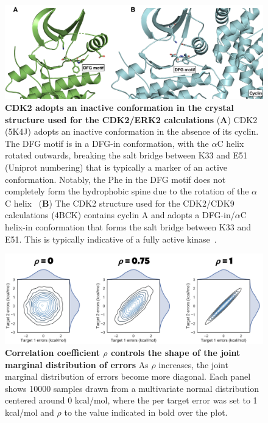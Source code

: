 \documentclass[phd,tocprelim]{cornell}
\begin{document}
\begin{landscape}
\begin{figure}[p]
\centering
\includegraphics[width=1.0\linewidth]{figures/supp_figure1.png}
\caption[CDK2 adopts an inactive conformation in the crystal structure used for the CDK2/ERK2 calculations]{
{\bf CDK2 adopts an inactive conformation in the crystal structure used for the CDK2/ERK2 calculations} 
({\bf A}) CDK2 (5K4J) adopts an inactive conformation in the absence of its cyclin. The DFG motif is in a DFG-in conformation, with the $\alpha$C helix rotated outwards, breaking the salt bridge between K33 and E51 (Uniprot numbering) that is typically a marker of an active conformation. Notably, the Phe in the DFG motif does not completely form the hydrophobic spine due to the rotation of the $\alpha$C helix~\citep{Hu:2015kh}
({\bf B}) The CDK2 structure used for the CDK2/CDK9 calculations (4BCK) contains cyclin A and adopts a DFG-in/$\alpha$C helix-in conformation that forms the salt bridge between K33 and E51. This is typically indicative of a fully active kinase~\citep{Huse2002-ml,Hari:2013dp}. 
}
\label{fig:sup-figure-1}
\end{figure}
\end{landscape}

\begin{landscape}
\begin{figure}[p]
\centering
\includegraphics[width=1.0\linewidth]{figures/supp_2.png}
\caption[ Correlation coefficient $\rho$ controls the shape of the joint marginal distribution of errors]{
{\bf Correlation coefficient $\rho$ controls the shape of the joint marginal distribution of errors} 
As $\rho$ increases, the joint marginal distribution of errors become more diagonal. Each panel shows 10000 samples drawn from a multivariate normal distribution centered around 0 kcal/mol, where the per target error was set to 1 kcal/mol and $\rho$ to the value indicated in bold over the plot. 
}
\label{fig:sup-figure-2}
\end{figure}
\end{landscape}
\end{document}
